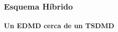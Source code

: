 \documentclass[11pt,aspectratio=169]{beamer}
\begin{document}
\begin{frame}[label=intro-convivencia]
  \frametitle{Esquema Híbrido}
  \framesubtitle{Un EDMD cerca de un TSDMD}


\end{frame}
\end{document}
